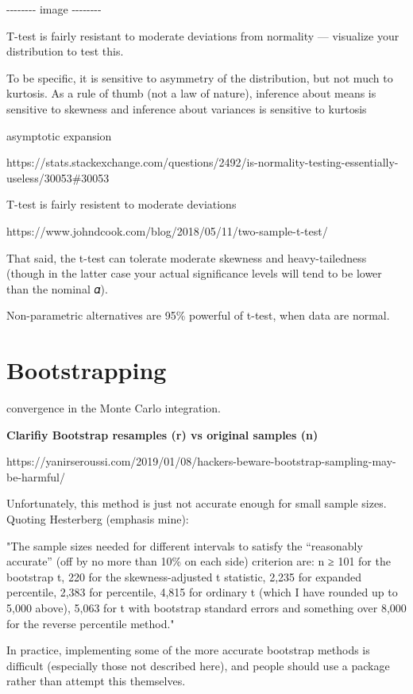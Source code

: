 \documentclass[11pt]{article}
\begin{document}
-\/-\/-\/-\/-\/-\/-\/- image -\/-\/-\/-\/-\/-\/-\/-

T-test is fairly resistant to moderate deviations from normality ---
visualize your distribution to test this.

To be specific, it is sensitive to asymmetry of the distribution, but
not much to kurtosis. As a rule of thumb (not a law of nature),
inference about means is sensitive to skewness and inference about
variances is sensitive to kurtosis

asymptotic expansion

https://stats.stackexchange.com/questions/2492/is-normality-testing-essentially-useless/30053\#30053

T-test is fairly resistent to moderate deviations

https://www.johndcook.com/blog/2018/05/11/two-sample-t-test/

That said, the t-test can tolerate moderate skewness and
heavy-tailedness (though in the latter case your actual significance
levels will tend to be lower than the nominal 𝛼).

Non-parametric alternatives are 95\% powerful of t-test, when data are
normal.

    \section{Bootstrapping}\label{bootstrapping}

convergence in the Monte Carlo integration.

\textbf{Clarifiy Bootstrap resamples (r) vs original samples (n)}

https://yanirseroussi.com/2019/01/08/hackers-beware-bootstrap-sampling-may-be-harmful/

Unfortunately, this method is just not accurate enough for small sample
sizes. Quoting Hesterberg (emphasis mine):

"The sample sizes needed for different intervals to satisfy the
``reasonably accurate'' (off by no more than 10\% on each side)
criterion are: n ≥ 101 for the bootstrap t, 220 for the
skewness-adjusted t statistic, 2,235 for expanded percentile, 2,383 for
percentile, 4,815 for ordinary t (which I have rounded up to 5,000
above), 5,063 for t with bootstrap standard errors and something over
8,000 for the reverse percentile method."

In practice, implementing some of the more accurate bootstrap methods is
difficult (especially those not described here), and people should use a
package rather than attempt this themselves.
\end{document}
